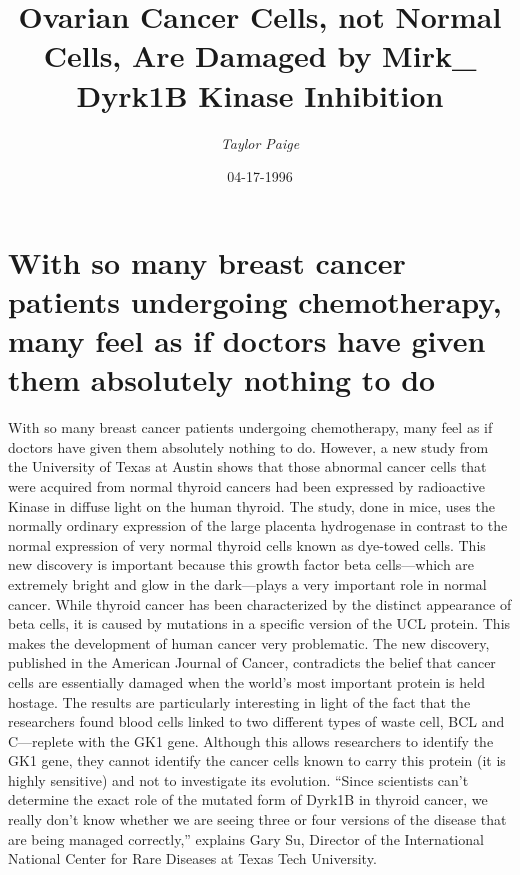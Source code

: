 \documentclass{article}%
\title{Ovarian Cancer Cells, not Normal Cells, Are Damaged by Mirk\_ Dyrk1B Kinase Inhibition}%
\author{\textit{Taylor Paige}}%
\date{04-17-1996}%
\begin{document}
%
\normalsize%
\maketitle%
\section{With so many breast cancer patients undergoing chemotherapy, many feel as if doctors have given them absolutely nothing to do}%
\label{sec:Withsomanybreastcancerpatientsundergoingchemotherapy,manyfeelasifdoctorshavegiventhemabsolutelynothingtodo}%
With so many breast cancer patients undergoing chemotherapy, many feel as if doctors have given them absolutely nothing to do.\newline%
However, a new study from the University of Texas at Austin shows that those abnormal cancer cells that were acquired from normal thyroid cancers had been expressed by radioactive Kinase in diffuse light on the human thyroid.\newline%
The study, done in mice, uses the normally ordinary expression of the large placenta hydrogenase in contrast to the normal expression of very normal thyroid cells known as dye{-}towed cells.\newline%
This new discovery is important because this growth factor beta cells—which are extremely bright and glow in the dark—plays a very important role in normal cancer.\newline%
While thyroid cancer has been characterized by the distinct appearance of beta cells, it is caused by mutations in a specific version of the UCL protein. This makes the development of human cancer very problematic.\newline%
The new discovery, published in the American Journal of Cancer, contradicts the belief that cancer cells are essentially damaged when the world’s most important protein is held hostage.\newline%
The results are particularly interesting in light of the fact that the researchers found blood cells linked to two different types of waste cell, BCL and C—replete with the GK1 gene.\newline%
Although this allows researchers to identify the GK1 gene, they cannot identify the cancer cells known to carry this protein (it is highly sensitive) and not to investigate its evolution.\newline%
“Since scientists can’t determine the exact role of the mutated form of Dyrk1B in thyroid cancer, we really don’t know whether we are seeing three or four versions of the disease that are being managed correctly,” explains Gary Su, Director of the International National Center for Rare Diseases at Texas Tech University.\newline%
\end{document}

